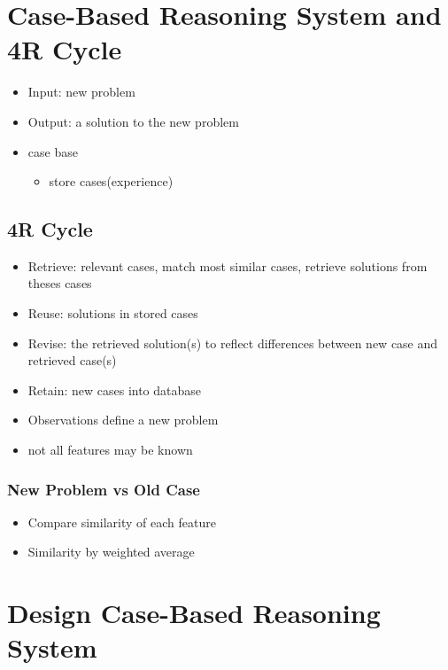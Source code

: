 \section{Case-Based Reasoning System and 4R Cycle}
\begin{itemize}
\item Input: new problem
\item Output: a solution to the new problem
\item case base
\begin{itemize}
\item store cases(experience)
\end{itemize}
\end{itemize}

\subsection{4R Cycle}
\begin{itemize}
\item Retrieve: relevant cases, match most similar cases, retrieve solutions from theses cases
\item Reuse: solutions in stored cases
\item Revise: the retrieved solution(s) to reflect differences between new case and retrieved case(s)
\item Retain: new cases into database
\end{itemize}

\begin{itemize}
\item Observations define a new problem
\item not all features may be known
\end{itemize}

\subsubsection{New Problem vs Old Case}
\begin{itemize}
\item Compare similarity of each feature
\item Similarity by weighted average
\end{itemize}

\section{Design Case-Based Reasoning System}
